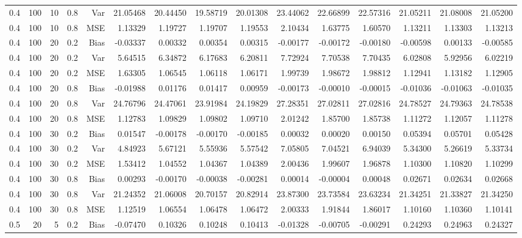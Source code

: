 \begin{table}[!htbp]
\begin{tabular}{lrrrrrrrrrrrrrr}
0.4 & 100 & 10 & 0.8 & Var & 21.05468 & 20.44450 & 19.58719 & 20.01308 & 23.44062 & 22.66899 & 22.57316 & 21.05211 & 21.08008 & 21.05200 \\
0.4 & 100 & 10 & 0.8 & MSE & 1.13329 & 1.19727 & 1.19707 & 1.19553 & 2.10434 & 1.63775 & 1.60570 & 1.13211 & 1.13303 & 1.13213 \\
0.4 & 100 & 20 & 0.2 & Bias & -0.03337 & 0.00332 & 0.00354 & 0.00315 & -0.00177 & -0.00172 & -0.00180 & -0.00598 & 0.00133 & -0.00585 \\
0.4 & 100 & 20 & 0.2 & Var & 5.64515 & 6.34872 & 6.17683 & 6.20811 & 7.72924 & 7.70538 & 7.70435 & 6.02808 & 5.92956 & 6.02219 \\
0.4 & 100 & 20 & 0.2 & MSE & 1.63305 & 1.06545 & 1.06118 & 1.06171 & 1.99739 & 1.98672 & 1.98812 & 1.12941 & 1.13182 & 1.12905 \\
0.4 & 100 & 20 & 0.8 & Bias & -0.01988 & 0.01176 & 0.01417 & 0.00959 & -0.00173 & -0.00010 & -0.00015 & -0.01036 & -0.01063 & -0.01035 \\
0.4 & 100 & 20 & 0.8 & Var & 24.76796 & 24.47061 & 23.91984 & 24.19829 & 27.28351 & 27.02811 & 27.02816 & 24.78527 & 24.79363 & 24.78538 \\
0.4 & 100 & 20 & 0.8 & MSE & 1.12783 & 1.09829 & 1.09802 & 1.09710 & 2.01242 & 1.85700 & 1.85738 & 1.11272 & 1.12057 & 1.11278 \\
0.4 & 100 & 30 & 0.2 & Bias & 0.01547 & -0.00178 & -0.00170 & -0.00185 & 0.00032 & 0.00020 & 0.00150 & 0.05394 & 0.05701 & 0.05428 \\
0.4 & 100 & 30 & 0.2 & Var & 4.84923 & 5.67121 & 5.55936 & 5.57542 & 7.05805 & 7.04521 & 6.94039 & 5.34300 & 5.26619 & 5.33734 \\
0.4 & 100 & 30 & 0.2 & MSE & 1.53412 & 1.04552 & 1.04367 & 1.04389 & 2.00436 & 1.99607 & 1.96878 & 1.10300 & 1.10820 & 1.10299 \\
0.4 & 100 & 30 & 0.8 & Bias & 0.00293 & -0.00170 & -0.00038 & -0.00281 & 0.00014 & -0.00004 & 0.00048 & 0.02671 & 0.02634 & 0.02668 \\
0.4 & 100 & 30 & 0.8 & Var & 21.24352 & 21.06008 & 20.70157 & 20.82914 & 23.87300 & 23.73584 & 23.63234 & 21.34251 & 21.33827 & 21.34250 \\
0.4 & 100 & 30 & 0.8 & MSE & 1.12519 & 1.06554 & 1.06478 & 1.06472 & 2.00333 & 1.91844 & 1.86017 & 1.10160 & 1.10360 & 1.10141 \\
0.5 &  20 &  5 & 0.2 & Bias & -0.07470 & 0.10326 & 0.10248 & 0.10413 & -0.01328 & -0.00705 & -0.00291 & 0.24293 & 0.24963 & 0.24327 \\

\end{tabular}
\end{table}
